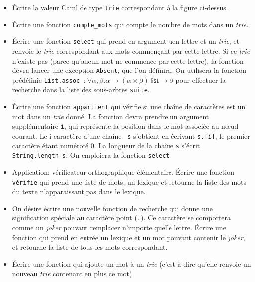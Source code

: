 \documentclass[11pt, a4paper]{article}
\begin{document}
\begin{itemize}

  \item[\textbf{A.1}] Écrire la valeur Caml de type \texttt{trie}
    correspondant à la figure ci-dessus.

  \item[\textbf{A.2}] Écrire une fonction \texttt{compte\_mots} qui
    compte le nombre de mots dans un \emph{trie}.

  \item[\textbf{A.3}] Écrire une fonction \texttt{select} qui prend en
    argument uen lettre et un \emph{trie}, et renvoie le \emph{trie}
    correspondant aux mots commençant par cette lettre. Si ce
    \emph{trie} n'existe pas (parce qu'aucun mot ne commence par cette
    lettre), la fonction devra lancer une exception {\tt Absent}, que
    l'on définira. On utilisera la fonction prédéfinie
    \texttt{List.assoc}~: $\forall \alpha, \beta.\alpha \rightarrow
    (\alpha \times \beta) \, \textsf{list} \rightarrow \beta$ pour
    effectuer la recherche dans la liste des sous-arbres
    \texttt{suite}.

  \item[\textbf{A.4}] Écrire une fonction \texttt{appartient} qui
    vérifie si une chaîne de caractères est un mot dans un {\em
      trie} donné. La fonction devra prendre un argument
    supplémentaire {\tt i}, qui représente la position dans le mot
    associée au nœud courant.  Le i\ieme{} caractère d'une chaîne {\tt
      s} s'obtient en écrivant {\tt s.[i]}, le premier caractère étant
    numéroté $0$. La longueur de la chaîne {\tt s} s'écrit {\tt
      String.length s}. On emploiera la fonction \texttt{select}.

  \item[\textbf{A.5}] Application: vérificateur orthographique
    élémentaire. Écrire une fonction \texttt{vérifie} qui prend une
    liste de mots, un lexique et retourne la liste des mots du texte
    n'apparaissant pas dans le lexique.

  \item[\textbf{A.6}] On désire écrire une nouvelle fonction de
    recherche qui donne une signification spéciale au caractère point
    (\texttt{.}). Ce caractère se comportera comme un \emph{joker}
    pouvant remplacer n'importe quelle lettre. Écrire une fonction qui
    prend en entrée un lexique et un mot pouvant contenir le
    \emph{joker}, et retourne la liste de tous les mots correspondant.

  \item[\textbf{A.7}] Écrire une fonction qui ajoute un mot à un
    \emph{trie} (c'est-à-dire qu'elle renvoie un nouveau \emph{trie}
    contenant en plus ce mot).

\end{itemize}
\end{document}
